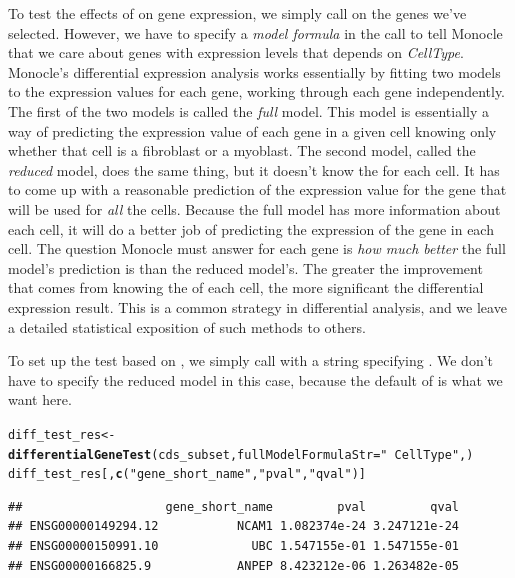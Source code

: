 \documentclass[10pt,oneside]{article}\usepackage[]{graphicx}\usepackage[]{color}
\makeatletter
\newcommand{\hlstr}[1]{\textcolor[rgb]{0.192,0.494,0.8}{#1}}%
\newcommand{\hlstd}[1]{\textcolor[rgb]{0.345,0.345,0.345}{#1}}%
\newcommand{\hlkwb}[1]{\textcolor[rgb]{0.69,0.353,0.396}{#1}}%
\newcommand{\hlkwc}[1]{\textcolor[rgb]{0.333,0.667,0.333}{#1}}%
\newcommand{\hlkwd}[1]{\textcolor[rgb]{0.737,0.353,0.396}{\textbf{#1}}}%
\newenvironment{kframe}{%
 \def\at@end@of@kframe{}%
 \ifinner\ifhmode%
  \def\at@end@of@kframe{\end{minipage}}%
  \begin{minipage}{\columnwidth}%
 \fi\fi%
 \def\FrameCommand##1{\hskip\@totalleftmargin \hskip-\fboxsep
 \colorbox{shadecolor}{##1}\hskip-\fboxsep
     \hskip-\linewidth \hskip-\@totalleftmargin \hskip\columnwidth}%
 \MakeFramed {\advance\hsize-\width
   \@totalleftmargin\z@ \linewidth\hsize
   \@setminipage}}%
 {\par\unskip\endMakeFramed%
 \at@end@of@kframe}
\newenvironment{knitrout}{}{} %
\makeatother
\begin{document}
To test the effects of  on gene expression, we simply call  on the genes we've selected. However, we have to specify a \emph{model formula} in the call to tell Monocle that we care about genes with expression levels that depends on \emph{CellType}.  Monocle's differential expression analysis works essentially by fitting two models to the expression values for each gene, working through each gene independently.  The first of the two models is called the \emph{full} model.  This model is essentially a way of predicting the expression value of each gene in a given cell knowing only whether that cell is a fibroblast or a myoblast.  The second model, called the \emph{reduced} model, does the same thing, but it doesn't know the  for each cell.  It has to come up with a reasonable prediction of the expression value for the gene that will be used for \emph{all} the cells. Because the full model has more information about each cell, it will do a better job of predicting the expression of the gene in each cell.  The question Monocle must answer for each gene is \emph{how much better} the full model's prediction is than the reduced model's. The greater the improvement that comes from knowing the  of each cell, the more significant the differential expression result. This is a common strategy in differential analysis, and we leave a detailed statistical exposition of such methods to others.

To set up the test based on , we simply call  with a string specifying .  We don't have to specify the reduced model in this case, because the default of  is what we want here.

\begin{knitrout}
\color{fgcolor}\begin{kframe}
\begin{alltt}
\hlstd{diff_test_res} \hlkwb{<-} \hlkwd{differentialGeneTest}\hlstd{(cds_subset,} \hlkwc{fullModelFormulaStr}\hlstd{=}\hlstr{"~CellType"}\hlstd{, )}
\hlstd{diff_test_res[,}\hlkwd{c}\hlstd{(}\hlstr{"gene_short_name"}\hlstd{,} \hlstr{"pval"}\hlstd{,} \hlstr{"qval"}\hlstd{)]}
\end{alltt}
\begin{verbatim}
##                    gene_short_name         pval         qval
## ENSG00000149294.12           NCAM1 1.082374e-24 3.247121e-24
## ENSG00000150991.10             UBC 1.547155e-01 1.547155e-01
## ENSG00000166825.9            ANPEP 8.423212e-06 1.263482e-05
\end{verbatim}
\end{kframe}
\end{knitrout}
\end{document}
